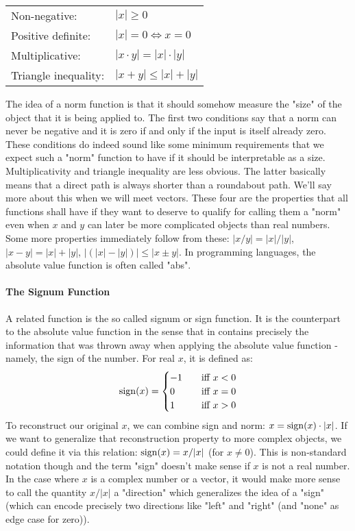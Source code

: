\medskip
\begin{tabular}{l l}
Non-negative:         & $|x| \geq 0$  \\
Positive definite:    & $|x| = 0 \Leftrightarrow x = 0$  \\
Multiplicative:       & $|x \cdot y| = |x| \cdot |y| $  \\
Triangle inequality:  & $|x + y| \leq |x| + |y| $
\end{tabular}
\medskip

The idea of a norm function is that it should somehow measure the "size" of the object that it is being applied to. The first two conditions say that a norm can never be negative and it is zero if and only if the input is itself already zero. These conditions do indeed sound like some minimum requirements that we expect such a "norm" function to have if it should be interpretable as a size. Multiplicativity and triangle inequality are less obvious. The latter basically means that a direct path is always shorter than a roundabout path. We'll say more about this when we will meet vectors. These four are the properties that all functions shall have if they want to deserve to qualify for calling them a "norm" even when $x$ and $y$ can later be more complicated objects than real numbers. Some more properties immediately follow from these: $|x/y| = |x|/|y|$, $|x-y| = |x| + |y|$, $\bigl| (|x|-|y|) \bigr| \leq |x \pm y|$. In programming languages, the absolute value function is often called "abs". %

\paragraph{The Signum Function}
A related function is the so called signum or sign function. It is the counterpart to the absolute value function in the sense that in contains precisely the information that was thrown away when applying the absolute value function - namely, the sign of the number. For real $x$, it is defined as:
\begin{equation}
\operatorname{sign}(x) = 
\begin{cases} 
 -1 \quad & \text{iff } x < 0 \\
  0 \quad & \text{iff } x = 0 \\ 
  1 \quad & \text{iff } x > 0 \\
\end{cases} 
\end{equation}
To reconstruct our original $x$, we can combine sign and norm: $x = \operatorname{sign}(x) \cdot |x|$. If we want to generalize that reconstruction property to more complex objects, we could define it via this relation: $\operatorname{sign}(x) = x / |x|$ (for $x \neq 0$). This is non-standard notation though and the term "sign" doesn't make sense if $x$ is not a real number. In the case where $x$ is a complex number or a vector, it would make more sense to call the quantity $x / |x|$ a "direction" which generalizes the idea of a "sign" (which can encode precisely two directions like "left" and "right" (and "none" as edge case for zero)).

